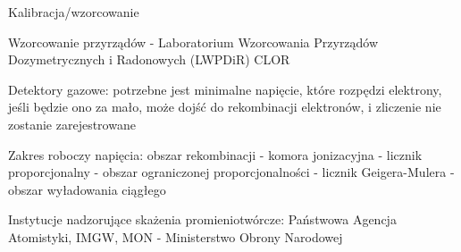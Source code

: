 \documentclass{article}
\begin{document}
Kalibracja\slash wzorcowanie

Wzorcowanie przyrządów - Laboratorium Wzorcowania Przyrządów Dozymetrycznych i Radonowych (LWPDiR) CLOR

Detektory gazowe: potrzebne jest minimalne napięcie, które rozpędzi elektrony, jeśli będzie ono za mało, może dojść do rekombinacji elektronów, i zliczenie nie zostanie zarejestrowane

Zakres roboczy napięcia: obszar rekombinacji - komora jonizacyjna - licznik proporcjonalny - obszar ograniczonej proporcjonalności - licznik Geigera-Mulera - obszar wyładowania ciągłego

Instytucje nadzorujące skażenia promieniotwórcze: Państwowa Agencja Atomistyki, IMGW, MON - Ministerstwo Obrony Narodowej
\end{document}
